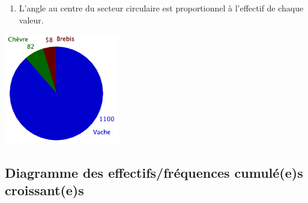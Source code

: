 \begin{multicols}{2}
  \begin{enumerate}
  \item L'angle au centre du secteur circulaire est proportionnel à l'effectif
    de chaque valeur.
  \end{enumerate}
  
  \medskip
  
  \columnbreak
  \begin{minipage}{1.0\linewidth}
    \vspace{-2em}
    \begin{center}
      \includegraphics[width=5cm]{Stats_Fig4_DiagCirc.png}
    \end{center}    
  \end{minipage}
\end{multicols}



\subsection{Diagramme des effectifs/fréquences cumulé(e)s croissant(e)s}

